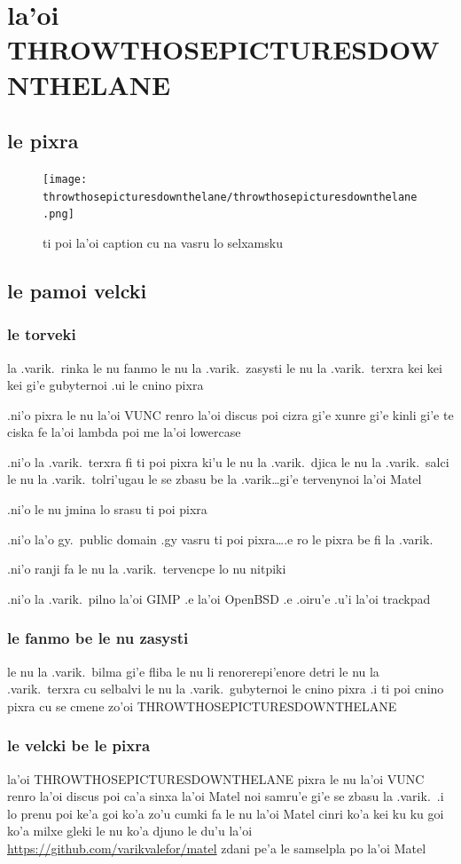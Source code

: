 \documentclass{report}
\begin{document}
\chapter{la'oi THROWTHOSEPICTURESDOWNTHELANE}
\section{le pixra}
\begin{figure}[ht]
	\centering
	\texttt{[image: throwthosepicturesdownthelane/throwthosepicturesdownthelane.png]}
	\caption[center]{ti poi la'oi caption cu na vasru lo selxamsku}
\end{figure}
\section{le pamoi velcki}
\subsection{le torveki}
la .varik.\ rinka le nu fanmo le nu la .varik.\ zasysti le nu la .varik.\ terxra kei kei kei gi'e gubyternoi .ui le cnino pixra

.ni'o pixra le nu la'oi VUNC renro la'oi discus poi cizra gi'e xunre gi'e kinli gi'e te ciska fe la'oi lambda poi me la'oi lowercase

.ni'o la .varik.\ terxra fi ti poi pixra ki'u le nu la .varik.\ djica le nu la .varik.\ salci le nu la .varik.\ tolri'ugau le se zbasu be la .varik\ldots gi'e tervenynoi la'oi Matel

.ni'o le nu jmina lo srasu ti poi pixra

.ni'o la'o gy.\ public domain .gy vasru ti poi pixra\ldots .e ro le pixra be fi la .varik.

.ni'o ranji fa le nu la .varik.\ tervencpe lo nu nitpiki

.ni'o la .varik.\ pilno la'oi GIMP .e la'oi OpenBSD .e .oiru'e .u'i la'oi trackpad

\subsection{le fanmo be le nu zasysti}
le nu la .varik.\ bilma gi'e fliba le nu li renorerepi'enore detri le nu la .varik.\ terxra cu selbalvi le nu la .varik.\ gubyternoi le cnino pixra  .i ti poi cnino pixra cu se cmene zo'oi THROWTHOSEPICTURESDOWNTHELANE

\subsection{le velcki be le pixra}
la'oi THROWTHOSEPICTURESDOWNTHELANE pixra le nu la'oi VUNC renro la'oi discus poi ca'a sinxa la'oi Matel noi samru'e gi'e se zbasu la .varik.\  .i lo prenu poi ke'a goi ko'a zo'u cumki fa le nu la'oi Matel cinri ko'a kei ku ku goi ko'a milxe gleki le nu ko'a djuno le du'u la'oi \url{https://github.com/varikvalefor/matel} zdani pe'a le samselpla po la'oi Matel
\end{document}
